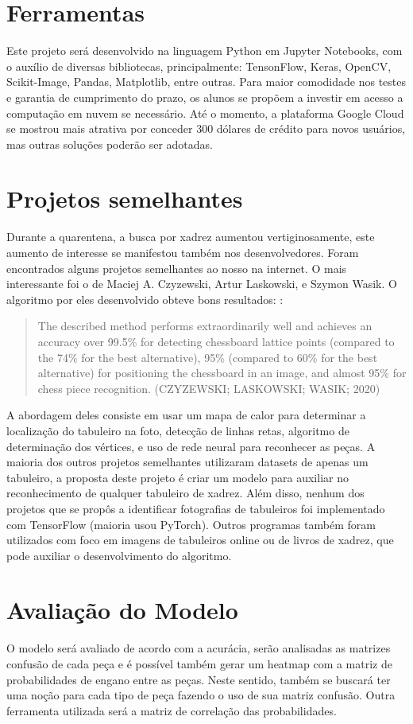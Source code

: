 \documentclass[a4paper,12pt,twoside]{article}
\begin{document}
\section{Ferramentas}
Este projeto será desenvolvido na linguagem Python em Jupyter Notebooks,
com o auxílio de diversas bibliotecas, principalmente:
TensonFlow, Keras, OpenCV, Scikit-Image, Pandas, Matplotlib, entre outras.
Para maior comodidade nos testes e garantia de cumprimento do prazo,
os alunos se propõem a investir em acesso a computação em nuvem se necessário.
Até o momento, a plataforma Google Cloud se mostrou mais atrativa por conceder 300 dólares de crédito para novos usuários,
mas outras soluções poderão ser adotadas.

\section{Projetos semelhantes}
Durante a quarentena, a busca por xadrez aumentou vertiginosamente,
este aumento de interesse se manifestou também nos desenvolvedores.
Foram encontrados alguns projetos semelhantes ao nosso na internet.
O mais interessante foi o de Maciej A. Czyzewski, Artur Laskowski, e Szymon Wasik.
O algoritmo por eles desenvolvido obteve bons resultados:
\cite{czy20}:
\blockquote{The described method performs extraordinarily well and achieves an accuracy over
            99.5\% for detecting chessboard lattice points (compared to the 74\% for the best alternative),
            95\% (compared to 60\% for the best alternative) for positioning the chessboard in an image, and almost
            95\% for chess piece recognition. (CZYZEWSKI; LASKOWSKI; WASIK; 2020)}

A abordagem deles consiste em usar um mapa de calor para determinar a localização do tabuleiro na foto,
detecção de linhas retas, algoritmo de determinação dos vértices, e uso de rede neural para reconhecer as peças.
A maioria dos outros projetos semelhantes utilizaram datasets de apenas um tabuleiro,
a proposta deste projeto é criar um modelo para auxiliar no reconhecimento de qualquer tabuleiro de xadrez.
Além disso, nenhum dos projetos que se propôs a identificar fotografias de tabuleiros foi implementado com TensorFlow
(maioria usou PyTorch).
Outros programas também foram utilizados com foco em imagens de tabuleiros online ou de livros de xadrez,
que pode auxiliar o desenvolvimento do algoritmo.

\section{Avaliação do Modelo}
O modelo será avaliado de acordo com a acurácia,
serão analisadas as matrizes confusão de cada peça e é possível também gerar um
heatmap com a matriz de probabilidades de engano entre as peças.
Neste sentido, também se buscará ter uma noção para cada tipo de peça fazendo o uso de sua matriz confusão.
Outra ferramenta utilizada será a matriz de correlação das probabilidades.

\nocite{*}
\printbibliography
\end{document}

